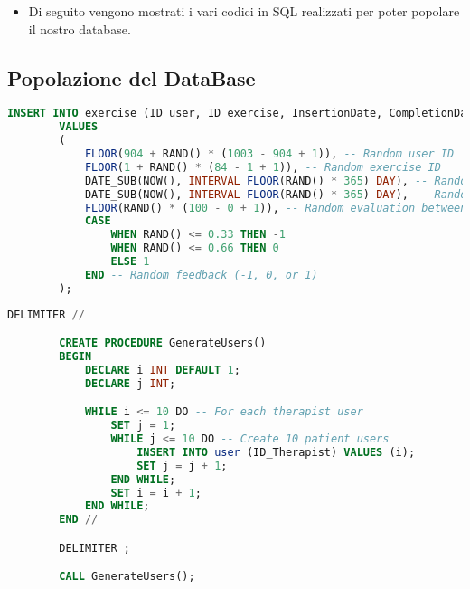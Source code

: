 \documentclass{article}
\begin{document}
    \begin{itemize}
        \item Di seguito vengono mostrati i vari codici in SQL realizzati per poter popolare il nostro database.
    \end{itemize}


    \pagebreak

    \subsection{Popolazione del DataBase}

    \begin{lstlisting}[language=SQL, breaklines, caption=Generazione Casuale esecuzione esercizio]
        INSERT INTO exercise (ID_user, ID_exercise, InsertionDate, CompletionDate, Evaluation, Feedback)
        VALUES
        (
            FLOOR(904 + RAND() * (1003 - 904 + 1)), -- Random user ID
            FLOOR(1 + RAND() * (84 - 1 + 1)), -- Random exercise ID
            DATE_SUB(NOW(), INTERVAL FLOOR(RAND() * 365) DAY), -- Random date within the past year
            DATE_SUB(NOW(), INTERVAL FLOOR(RAND() * 365) DAY), -- Random completion date within the past year
            FLOOR(RAND() * (100 - 0 + 1)), -- Random evaluation between 0 and 100
            CASE
                WHEN RAND() <= 0.33 THEN -1
                WHEN RAND() <= 0.66 THEN 0
                ELSE 1
            END -- Random feedback (-1, 0, or 1)
        );
    \end{lstlisting}

    \begin{lstlisting}[language=SQL, breaklines, caption=Generazione degli utenti]
        DELIMITER //

        CREATE PROCEDURE GenerateUsers()
        BEGIN
            DECLARE i INT DEFAULT 1;
            DECLARE j INT;

            WHILE i <= 10 DO -- For each therapist user
                SET j = 1;
                WHILE j <= 10 DO -- Create 10 patient users
                    INSERT INTO user (ID_Therapist) VALUES (i); 
                    SET j = j + 1;
                END WHILE;
                SET i = i + 1;
            END WHILE;
        END //

        DELIMITER ;

        CALL GenerateUsers();
    \end{lstlisting}
\end{document}
